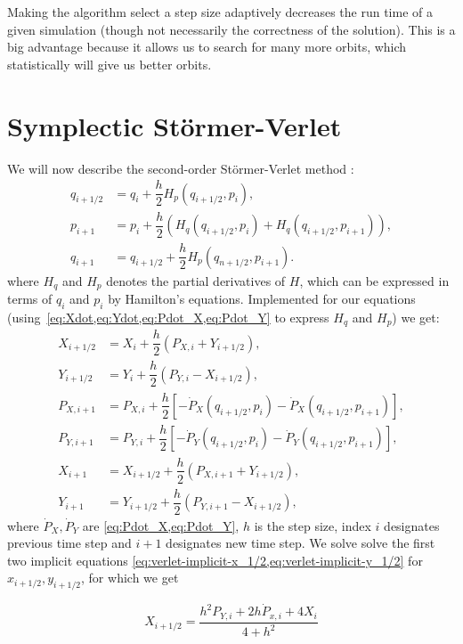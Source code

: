 Making the algorithm select a step size adaptively decreases the run time of a given simulation (though not necessarily the correctness of the solution). This is a big advantage because it allows us to search for many more orbits, which statistically will give us better orbits.

\section{Symplectic Störmer-Verlet}
We will now describe the second-order Störmer-Verlet method \cite{Hochbruck2008}:
\begin{align}
q_{i+1/2} &= q_i + \dfrac{h}{2}H_p(q_{i+1/2}, p_i), \\
p_{i+1} &= p_i + \dfrac{h}{2}(H_q(q_{i+1/2}, p_i) + H_q(q_{i+1/2}, p_{i+1})), \\
q_{i+1} &= q_{i+1/2} + \dfrac{h}{2}H_p(q_{n+1/2}, p_{i+1}).
\end{align}
where $H_q$ and $H_p$ denotes the partial derivatives of $H$, which can be expressed in terms of $q_i$ and $p_i$ by Hamilton's equations. Implemented for our equations (using~\cref{eq:Xdot,eq:Ydot,eq:Pdot_X,eq:Pdot_Y} to express $H_q$ and $H_p$) we get:
\begin{align}
X_{i+1/2} &= X_i + \dfrac{h}{2} (P_{X,i} + Y_{i+1/2}) , \label{eq:verlet-implicit-x_1/2} \\[0.3cm]
Y_{i+1/2} &= Y_i + \dfrac{h}{2} (P_{Y,i} - X_{i+1/2}), \label{eq:verlet-implicit-y_1/2} \\[0.8cm]
%
%
P_{X,i+1} &= P_{X,i} + \dfrac{h}{2} \left[-\dot{P}_X(q_{i+1/2},p_i) -\dot{P}_X(q_{i+1/2},p_{i+1}) \right], \label{eq:verlet-implicit-px_1} \\[0.3cm]
%
P_{Y,i+1} &= P_{Y,i} + \dfrac{h}{2} \left[-\dot{P}_Y(q_{i+1/2},p_i) -\dot{P}_Y(q_{i+1/2},p_{i+1}) \right], \label{eq:verlet-implicit-py_1} \\[0.8cm]
%
%
X_{i+1} &= X_{i+1/2} + \dfrac{h}{2} (P_{X,i+1} + Y_{i+1/2}), \label{eq:verlet-explicit-x_1} \\[0.3cm]
Y_{i+1} &= Y_{i+1/2} + \dfrac{h}{2} (P_{Y,i+1} - X_{i+1/2}), \label{eq:verlet-explicit-y_1}
\end{align}
where \(\dot{P}_X,\dot{P}_Y\) are \cref{eq:Pdot_X,eq:Pdot_Y}, \(h\) is the step size, index \(i\) designates previous time step and \(i+1\) designates new time step.
We solve solve the first two implicit equations \cref{eq:verlet-implicit-x_1/2,eq:verlet-implicit-y_1/2} for \(x_{i+1/2},y_{i+1/2}\), for which we get

\begin{equation}
    X_{i+1/2} = \frac{h^2 P_{Y,i} + 2 h \dot{P}_{x,i} + 4 X_i}{4 + h^2} \label{eq:verlet-explicit-x_1/2}
\end{equation}

